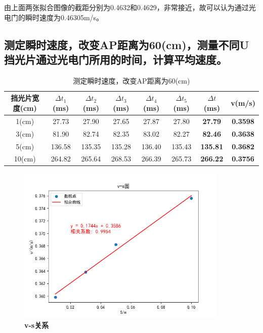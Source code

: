 \documentclass[UTF8]{article}
\theoremstyle{MyLineTheoremStyle} %
\theoremstyle{MyBlockTheoremStyle} %
\theoremstyle{MySubsubsectionStyle} %
\begin{document}
\indent 由上面两张拟合图像的截距分别为0.4632和0.4629，非常接近，故可以认为通过光电门的瞬时速度为0.46305m/s。\\






\subsection{测定瞬时速度，改变AP距离为60(cm)，测量不同U挡光片通过光电门所用的时间，计算平均速度。}

\begin{table}[H]
    \centering
    \begin{tabular}{|c|c|c|c|c|c|c|c|}
        \hline
        挡光片宽度(cm) & $\Delta t_1$(ms) & $\Delta t_2$(ms) & $\Delta t_3$(ms) & $\Delta t_4$(ms) & $\Delta t_5$(ms) & $\Delta t$(ms) & v(m/s)\\
        \hline
        1(cm) & 27.73 & 27.90 & 27.65 & 27.87 & 27.80 & \textbf{27.79} & \textbf{0.3598}\\
        \hline
        3(cm) & 81.90 & 82.74 & 82.35 & 83.02 & 82.27 & \textbf{82.46} & \textbf{0.3638}\\
        \hline
        5(cm) & 136.58 & 135.35 & 135.28 & 136.40 & 135.43 & \textbf{135.81} & \textbf{0.3682}\\
        \hline
        10(cm) & 264.82 & 265.64 & 268.53 & 266.39 & 265.73 & \textbf{266.22} & \textbf{0.3756}\\
        \hline			
    \end{tabular}
    \caption{\small 测定瞬时速度，改变AP距离为60(cm)}
\end{table}


\begin{figure}[H]
    \centering
    \includegraphics[width=0.9\textwidth]{Figure_9.png}
    \caption{\bfseries v-s关系}
\end{figure}
\end{document}
